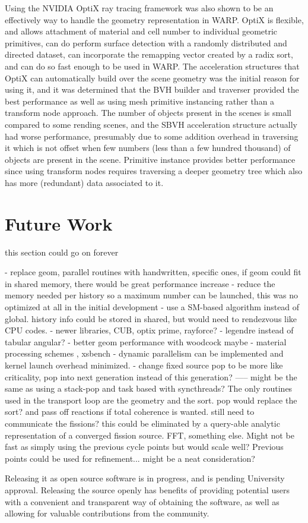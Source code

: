 Using the NVIDIA OptiX ray tracing framework was also shown to be an effectively way to handle the geometry representation in WARP.  OptiX is flexible, and allows attachment of material and cell number to individual geometric primitives, can do perform surface detection with a randomly distributed and directed dataset, can incorporate the remapping vector created by a radix sort, and can do so fast enough to be used in WARP.  The acceleration structures that OptiX can automatically build over the scene geometry was the initial reason for using it, and it was determined that the BVH builder and traverser provided the best performance as well as using mesh primitive instancing rather than a transform node approach.  The number of objects present in the scenes is small compared to some rending scenes, and the SBVH acceleration structure actually had worse performance, presumably due to some addition overhead in traversing it which is not offset when few numbers (less than a few hundred thousand) of objects are present in the scene.  Primitive instance provides better performance since using transform nodes requires traversing a deeper geometry tree which also has more (redundant) data associated to it.

\section{Future Work}

this section could go on forever

- replace geom, parallel routines with handwritten, specific ones, if geom could fit in shared memory, there would be great performance increase
- reduce the memory needed per history so a maximum number can be launched, this was no optimized at all in the initial development
- use a SM-based algorithm instead of global.  history info could be stored in shared, but would need to rendezvous like CPU codes.
- newer libraries, CUB, optix prime, rayforce?
- legendre instead of tabular angular?
- better geom performance with woodcock maybe
- material processing schemes , xsbench \cite{openmc}
- dynamic parallelism can be implemented and kernel launch overhead minimized.  
- change fixed source pop to be more like criticality, pop into next generation instead of this generation?
-----  might be the same as using a stack-pop and task based with syncthreads?  The only routines used in the transport loop are the geometry and the sort.   pop would replace the sort?  and pass off reactions if total coherence is wanted.  still need to communicate the fissions?  this could be eliminated by a query-able analytic representation of a converged fission source.  FFT, something else.  Might not be fast as simply using the previous cycle points but would scale well?  Previous points could be used for refinement...  might be a neat consideration?

Releasing it as open source software is in progress, and is pending University approval.  Releasing the source openly has benefits of providing potential users with a convenient and transparent way of obtaining the software, as well as allowing for valuable contributions from the community.